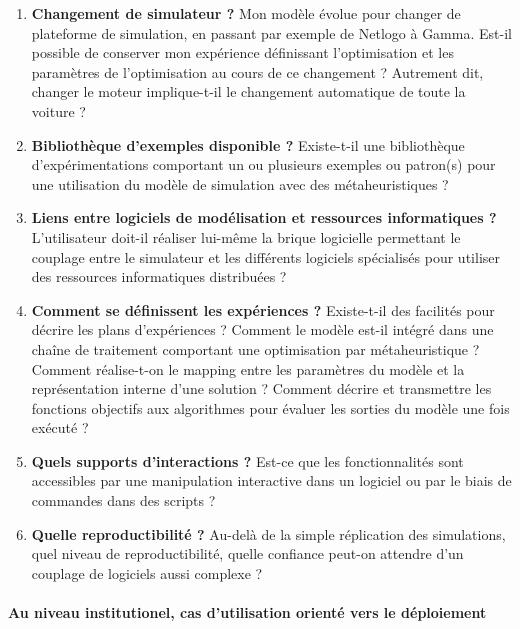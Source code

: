 \begin{enumerate}

	\item{\textbf{Changement de simulateur ?}} Mon modèle évolue pour changer de plateforme de simulation, en passant par exemple de Netlogo à Gamma. Est-il possible de conserver mon expérience définissant l'optimisation et les paramètres de l'optimisation au cours de ce changement ? Autrement dit, changer le moteur implique-t-il le changement automatique de toute la voiture ? 
	
	\item{\textbf{Bibliothèque d'exemples disponible ?}} Existe-t-il une bibliothèque d'expérimentations comportant un ou plusieurs exemples ou patron(s) pour une utilisation du modèle de simulation avec des métaheuristiques ?
	
	\item{\textbf{Liens entre logiciels de modélisation et ressources informatiques ?}} L'utilisateur doit-il réaliser lui-même la brique logicielle permettant le couplage entre le simulateur et les différents logiciels spécialisés pour utiliser des ressources informatiques distribuées ?

	\item{\textbf{Comment se définissent les expériences ?}} Existe-t-il des facilités pour décrire les plans d'expériences ? Comment le modèle est-il intégré dans une chaîne de traitement comportant une optimisation par métaheuristique ? Comment réalise-t-on le mapping entre les paramètres du modèle et la représentation interne d'une solution ? Comment décrire et transmettre les fonctions objectifs aux algorithmes pour évaluer les sorties du modèle une fois exécuté ?
	
	\item{\textbf{Quels supports d'interactions ?}} Est-ce que les fonctionnalités sont accessibles par une manipulation interactive dans un logiciel ou par le biais de commandes dans des scripts ?

	\item{\textbf{Quelle reproductibilité ?}} Au-delà de la simple réplication des simulations, quel niveau de reproductibilité, quelle confiance peut-on attendre d'un couplage de logiciels aussi complexe ?

\end{enumerate}

\paragraph{Au niveau institutionel, cas d'utilisation orienté vers le déploiement }

